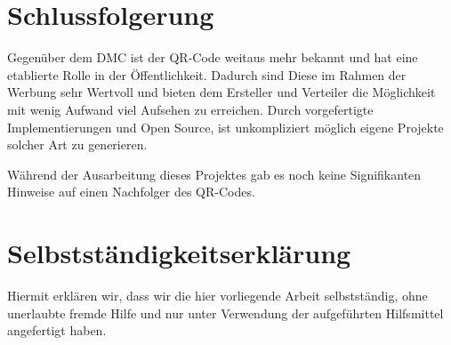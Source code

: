 \documentclass[12pt,					%
							 oneside,			%
							 a4paper,			%
							 halfparskip,		%
							 liststotoc,			%
							 bibtotoc,			%
							 fleqn,				%
							 pointlessnumbers]	%
							 {scrreprt}
\begin{document}
\chapter{Schlussfolgerung}
Gegenüber dem DMC ist der QR-Code weitaus mehr bekannt und hat eine etablierte Rolle in der Öffentlichkeit. Dadurch sind Diese im Rahmen der Werbung sehr Wertvoll und bieten dem Ersteller und Verteiler die Möglichkeit mit wenig Aufwand viel Aufsehen zu erreichen. 
Durch vorgefertigte Implementierungen und Open Source, ist unkompliziert möglich eigene Projekte solcher Art zu generieren. 

Während der Ausarbeitung dieses Projektes gab es noch keine Signifikanten Hinweise auf einen Nachfolger des QR-Codes. 








	
	
	\nocite{*}						%
	

	\listoffigures						%

	\appendix
	

	\chapter*{Selbstst\"andigkeitserkl\"arung}
	Hiermit erkl\"aren wir, dass wir die hier vorliegende Arbeit selbstst\"andig,
	ohne unerlaubte fremde Hilfe und nur unter Verwendung der aufgef\"uhrten
	Hilfsmittel angefertigt haben.
\end{document}
